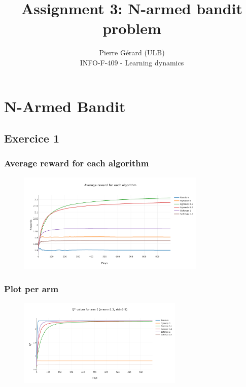 \documentclass[11pt]{article}
\begin{document}
 
 
\setlength\parindent{0pt}
 
\title{Assignment 3: N-armed bandit problem}%
\author{Pierre Gérard (ULB)\\ %
INFO-F-409 - Learning dynamics} %
 
\maketitle

\section{N-Armed Bandit}

\subsection{Exercice 1}

\subsubsection{Average reward for each algorithm}

\begin{figure}[H]
   \centering
   \includegraphics[width=0.8\textwidth]{img/1-1/reward.png}
\end{figure}

\subsubsection{Plot per arm}

\begin{figure}[H]
   \centering
   \includegraphics[width=0.7\textwidth]{img/1-1/q1.png}
\end{figure}
\end{document}
